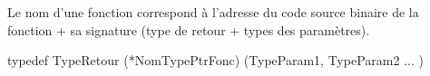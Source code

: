  Le nom d'une fonction correspond à l'adresse du code source binaire de la fonction + sa signature (type de retour + types des paramètres).\\

\par

 typedef TypeRetour (*NomTypePtrFonc) (TypeParam1, TypeParam2 ... ) \\

\par


